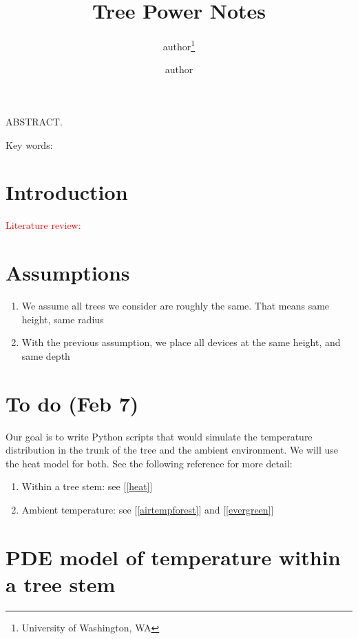 \documentclass[12pt]{article}
\title{Tree Power Notes}
\author{author\thanks{University of Washington, WA} %
\and author\footnotemark[1]}
\begin{document}
\maketitle

\noindent ABSTRACT. 

\vspace{1cm}

\noindent Key words: 


\section*{Introduction}  \textcolor{red}{Literature review:}



\section{Assumptions}

\begin{enumerate}
\item We assume all trees we consider are roughly the same. That means same height, same radius
\item With the previous assumption, we place all devices at the same height, and same depth
\end{enumerate}

\section{To do (Feb 7)}
Our goal is to write Python scripts that would simulate the temperature distribution in the trunk of the tree and the ambient environment. We will use the heat model for both. See the following reference for more detail:
\begin{enumerate}
\item Within a tree stem: see [\ref{heat}]
\item Ambient temperature: see [\ref{airtempforest}] and [\ref{evergreen}]
\end{enumerate}

\section{PDE model of temperature within a tree stem}
\end{document}
